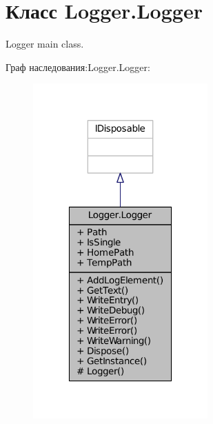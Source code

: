 \hypertarget{class_logger_1_1_logger}{}\section{Класс Logger.\+Logger}
\label{class_logger_1_1_logger}


Logger main class.  




Граф наследования\+:Logger.\+Logger\+:
\nopagebreak
\begin{figure}[H]
\begin{center}
\leavevmode
\includegraphics[width=190pt]{class_logger_1_1_logger__inherit__graph}
\end{center}
\end{figure}


